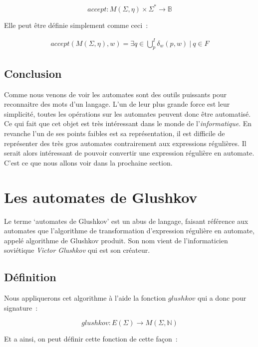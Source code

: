 \documentclass[12pt]{article}
\begin{document}
\[
    accept: M(\Sigma, \eta) \times \Sigma^* \to \mathbb{B}
\]

Elle peut être définie simplement comme ceci~:

\begin{align}
    accept(M(\Sigma, \eta), w) = \exists q \in \bigcup_{p}^I \delta_w(p, w) ~|~ q \in F
\end{align}

\subsection{Conclusion}

Comme nous venons de voir les automates sont des outils puissants pour
reconnaitre des mots d'un langage. L'un de leur plus grande force est leur
simplicité, toutes les opérations sur les automates peuvent donc être
automatisé. Ce qui fait que cet objet est très intéressant dans le monde de
l'\textit{informatique}. En revanche l'un de ses points faibles est sa
représentation, il est difficile de représenter des très gros automates
contrairement aux expressions régulières. Il serait alors intéressant de
pouvoir convertir une expression régulière en automate. C'est ce que nous
allons voir dans la prochaine section.

\section{Les automates de Glushkov}\label{sec:glushkov}

Le terme `automates de Glushkov' est un abus de langage, faisant référence aux
automates que l'algorithme de transformation d'expression régulière en
automate, appelé algorithme de Glushkov produit. Son nom vient de
l'informaticien soviétique \textit{Victor Glushkov} qui est son créateur.

\subsection{Définition}

Nous appliquerons cet algorithme à l'aide la fonction \(glushkov\) qui a donc
pour signature~:

\[
    glushkov: E(\Sigma) \to M(\Sigma, \mathbb{N})
\]

Et a ainsi, on peut définir cette fonction de cette façon~:
\end{document}
